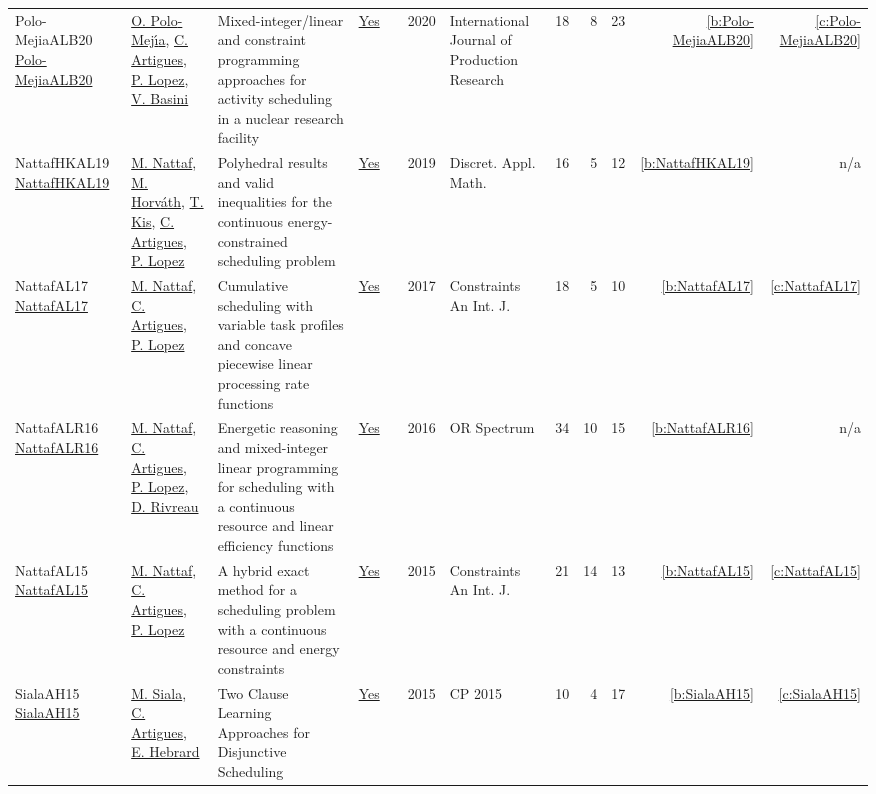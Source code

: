 {\begin{longtable}{>{\raggedright\arraybackslash}p{3cm}>{\raggedright\arraybackslash}p{6cm}>{\raggedright\arraybackslash}p{6.5cm}rrrp{2.5cm}rrrrr}
Polo-MejiaALB20 \href{https://doi.org/10.1080/00207543.2019.1693654}{Polo-MejiaALB20} & \hyperref[auth:a520]{O. Polo{-}Mej{\'{\i}}a}, \hyperref[auth:a6]{C. Artigues}, \hyperref[auth:a3]{P. Lopez}, \hyperref[auth:a521]{V. Basini} & Mixed-integer/linear and constraint programming approaches for activity scheduling in a nuclear research facility & \href{../works/Polo-MejiaALB20.pdf}{Yes} & \cite{Polo-MejiaALB20} & 2020 & International Journal of Production Research & 18 & 8 & 23 & \ref{b:Polo-MejiaALB20} & \ref{c:Polo-MejiaALB20}\\
NattafHKAL19 \href{https://doi.org/10.1016/j.dam.2018.11.008}{NattafHKAL19} & \hyperref[auth:a81]{M. Nattaf}, \hyperref[auth:a1009]{M. Horv{\'{a}}th}, \hyperref[auth:a156]{T. Kis}, \hyperref[auth:a6]{C. Artigues}, \hyperref[auth:a3]{P. Lopez} & Polyhedral results and valid inequalities for the continuous energy-constrained scheduling problem & \href{../works/NattafHKAL19.pdf}{Yes} & \cite{NattafHKAL19} & 2019 & Discret. Appl. Math. & 16 & 5 & 12 & \ref{b:NattafHKAL19} & n/a\\
NattafAL17 \href{https://doi.org/10.1007/s10601-017-9271-4}{NattafAL17} & \hyperref[auth:a81]{M. Nattaf}, \hyperref[auth:a6]{C. Artigues}, \hyperref[auth:a3]{P. Lopez} & Cumulative scheduling with variable task profiles and concave piecewise linear processing rate functions & \href{../works/NattafAL17.pdf}{Yes} & \cite{NattafAL17} & 2017 & Constraints An Int. J. & 18 & 5 & 10 & \ref{b:NattafAL17} & \ref{c:NattafAL17}\\
NattafALR16 \href{https://doi.org/10.1007/s00291-015-0423-x}{NattafALR16} & \hyperref[auth:a81]{M. Nattaf}, \hyperref[auth:a6]{C. Artigues}, \hyperref[auth:a3]{P. Lopez}, \hyperref[auth:a991]{D. Rivreau} & Energetic reasoning and mixed-integer linear programming for scheduling with a continuous resource and linear efficiency functions & \href{../works/NattafALR16.pdf}{Yes} & \cite{NattafALR16} & 2016 & {OR} Spectrum & 34 & 10 & 15 & \ref{b:NattafALR16} & n/a\\
NattafAL15 \href{https://doi.org/10.1007/s10601-015-9192-z}{NattafAL15} & \hyperref[auth:a81]{M. Nattaf}, \hyperref[auth:a6]{C. Artigues}, \hyperref[auth:a3]{P. Lopez} & A hybrid exact method for a scheduling problem with a continuous resource and energy constraints & \href{../works/NattafAL15.pdf}{Yes} & \cite{NattafAL15} & 2015 & Constraints An Int. J. & 21 & 14 & 13 & \ref{b:NattafAL15} & \ref{c:NattafAL15}\\
SialaAH15 \href{https://doi.org/10.1007/978-3-319-23219-5_28}{SialaAH15} & \hyperref[auth:a130]{M. Siala}, \hyperref[auth:a6]{C. Artigues}, \hyperref[auth:a1]{E. Hebrard} & Two Clause Learning Approaches for Disjunctive Scheduling & \href{../works/SialaAH15.pdf}{Yes} & \cite{SialaAH15} & 2015 & CP 2015 & 10 & 4 & 17 & \ref{b:SialaAH15} & \ref{c:SialaAH15}\\

\end{longtable}}
